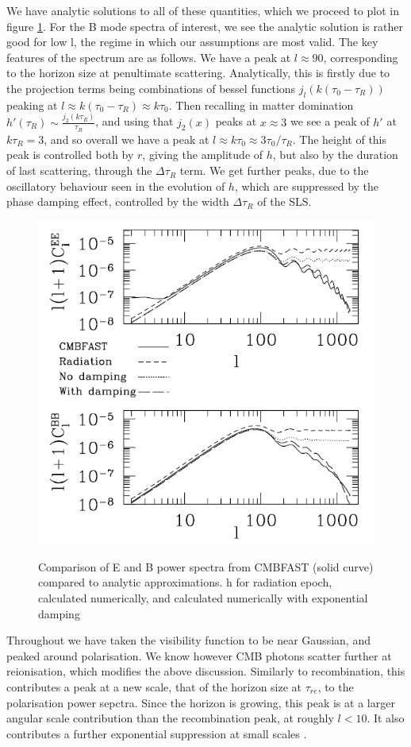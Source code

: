 \documentclass[a4paper,10pt]{article}
\begin{document}
We have analytic solutions to all of these quantities, which we proceed to plot in figure \ref{analytic1}. For the B mode spectra of interest, we see the analytic solution is rather good for low l, the regime in which our assumptions are most valid. The key features of the spectrum are as follows. We have a peak at $l\approx 90$, corresponding to the horizon size at penultimate scattering. Analytically, this is firstly due to the projection terms being combinations of bessel functions $j_l(k(\tau_0-\tau_R))$ peaking at $l\approx k(\tau_0-\tau_R)\approx k\tau_0$. Then recalling in matter domination $h'(\tau_R) \sim \frac{j_2(k\tau_R)}{\tau_R}$, and using that $j_2(x)$ peaks at $x\approx3$ we see a peak of $h'$ at $k\tau_R=3$, and so overall we have a peak at $l\approx k\tau_0\approx 3\tau_0/\tau_R$. The height of this peak is controlled both by $r$, giving the amplitude of $h$, but also by the duration of last scattering, through the $\Delta\tau_R$ term. We get further peaks, due to the oscillatory behaviour seen in the evolution of $h$, which are suppressed by the phase damping effect, controlled by the width $\Delta\tau_R$ of the SLS. 



\begin{figure}[h]
  \includegraphics[width=0.5\linewidth]{analytic.png}
  \centering
  \label{analytic1}
  \caption{Comparison of E and B power spectra from CMBFAST (solid curve) compared to analytic approximations. h for radiation epoch, calculated numerically, and calculated numerically  with exponential damping}
\end{figure}


Throughout we have taken the visibility function to be near Gaussian, and peaked around polarisation. We know however CMB photons scatter further at reionisation, which modifies the above discussion. Similarly to recombination, this contributes a peak at a new scale, that of the horizon size at $\tau_{re}$, to the polarisation power sepctra. Since the horizon is growing, this peak is at a larger angular scale contribution than the recombination peak, at roughly $l<10$. It also contributes a further exponential suppression at small scales \cite{reionisation2}.\\
\end{document}
